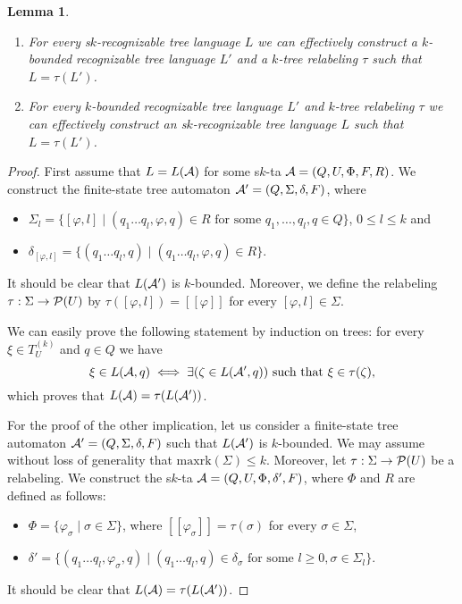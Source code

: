 \documentclass[10pt]{scrartcl}
\newtheorem{lm}[df]{Lemma}
\newcommand{\seml}{[\![}
\newcommand{\semr}{]\!]}
\newcommand{\maxrk}{{\mathrm{maxrk}}}
\newcommand{\A}{{\cal A}}
\newcommand{\PS}{{\cal P}}
\def\ui#1{^{(#1)}}
\begin{document}
\begin{lm}\label{char-rec-lemma}\rm $\ $
\begin{enumerate}
\item For every s$k$-recognizable tree
  language $L$ we can effectively construct a $k$-bounded recognizable tree
  language $L'$ and a $k$-tree relabeling $\tau$ such that $L =
  \tau(L')$. 
\item For every  $k$-bounded recognizable tree language $L'$ and
  $k$-tree relabeling $\tau$ we can effectively construct an s$k$-recognizable tree
  language $L$ such that  $L =
  \tau(L')$.
\end{enumerate}
\end{lm}
\begin{proof} First assume that $L=L(\A)$ for some s$k$-ta $\A = (Q,U,\Phi,F,R)$. We construct the finite-state tree automaton
$\A' = (Q,\Sigma,\delta,F)$, where
\begin{itemize}
\item $\Sigma_l = \{[\varphi,l] \mid (q_1\ldots q_l,\varphi,q)\in R \text{ for some }  q_1,\ldots, q_l,q\in Q\} $, $0\le l\le k$ and
\item $\delta_{[\varphi,l]} = \{ (q_1\ldots q_l,q) \mid (q_1\ldots q_l,\varphi,q)\in R \}$.
\end{itemize}
It should be clear that $L(\A')$ is $k$-bounded. Moreover, we define the relabeling $\tau: \Sigma \to \PS(U)$ by $\tau([\varphi,l])=\seml \varphi\semr$ for every $[\varphi,l]\in\Sigma$.

We can easily prove the following statement by induction on trees: for every $\xi\in T_U\ui k$ and $q\in Q$ we have
\[ \xi \in L(\A,q) \iff \exists(\zeta \in L(\A',q)) \text{ such that } \xi \in \tau(\zeta),\]
which proves that $L(\A)=\tau(L(\A'))$.

For the proof of the other implication,  let us consider a finite-state tree automaton $\A' = (Q,\Sigma,\delta,F)$ 
such that $L(\A')$ is $k$-bounded. We may assume without loss of generality that $\maxrk(\Sigma) \le k$. Moreover,
let $\tau: \Sigma \to \PS(U)$ be a relabeling. We construct the s$k$-ta $\A = (Q,U,\Phi,\delta',F)$, where $\Phi$ and $R$ are defined as follows:
\begin{itemize}
\item $\Phi=\{ \varphi_\sigma \mid \sigma \in \Sigma\}$, where $\seml \varphi_\sigma \semr =\tau(\sigma)$ for every $\sigma \in\Sigma$, 
\item $\delta'=\{ (q_1\ldots q_l,\varphi_\sigma,q) \mid (q_1\ldots q_l,q) \in \delta_\sigma \text{ for some } l\ge 0, \sigma \in\Sigma_l\}$.
\end{itemize}
It should be clear that $L(\A)=\tau(L(\A'))$.
\end{proof}
\end{document}
